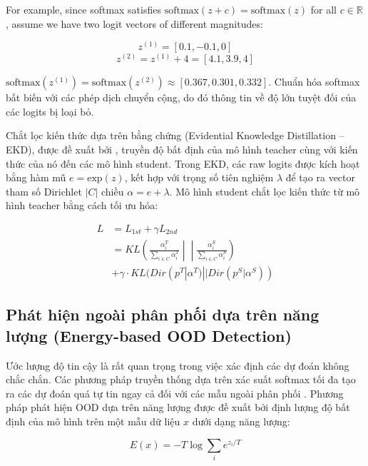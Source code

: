 For example, since softmax satisfies $\text{softmax}(z+c) = \text{softmax}(z)$ for all $c \in \mathbb{R}$, assume we have two logit vectors of different magnitudes:

$$z^{(1)} = [0.1, -0.1, 0]$$
$$z^{(2)} = z^{(1)}+4 = [4.1, 3.9, 4]$$

$\text{softmax}(z^{(1)}) = \text{softmax}(z^{(2)}) \approx [0.367, 0.301, 0.332]$. Chuẩn hóa softmax bất biến với các phép dịch chuyển cộng, do đó thông tin về độ lớn tuyệt đối của các logits bị loại bỏ.

Chắt lọc kiến thức dựa trên bằng chứng (Evidential Knowledge Distillation -- EKD), được đề xuất bởi \cite{xiang2025ekd}, truyền độ bất định của mô hình teacher cùng với kiến thức của nó đến các mô hình student. Trong EKD, các raw logits được kích hoạt bằng hàm mũ $e=\text{exp}(z)$, kết hợp với trọng số tiên nghiệm $\lambda$ để tạo ra vector tham số Dirichlet $|C|$ chiều $\alpha = e + \lambda$. Mô hình student chắt lọc kiến thức từ mô hình teacher bằng cách tối ưu hóa:

\begin{equation}
\label{ekd}
\begin{split}
L & = L_{1st} + \gamma L_{2nd} \\
  & = KL\left(\frac{\alpha_i^T}{\sum_{i \in C}\alpha_i^T} \middle|\middle| \frac{\alpha_i^S}{\sum_{i \in C}\alpha_i^S}\right) \\
  & +\gamma \cdot KL(Dir(p^T|\alpha^T)||Dir(p^S|\alpha^S))
\end{split}
\end{equation}

\subsection{Phát hiện ngoài phân phối dựa trên năng lượng (Energy-based OOD Detection)}
\label{sec:energy}

Ước lượng độ tin cậy là rất quan trọng trong việc xác định các dự đoán không chắc chắn. Các phương pháp truyền thống dựa trên xác suất softmax tối đa tạo ra các dự đoán quá tự tin ngay cả đối với các mẫu ngoài phân phối \cite{liu2020energy}. Phương pháp phát hiện OOD dựa trên năng lượng được đề xuất bởi \cite{liu2020energy} định lượng độ bất định của mô hình trên một mẫu dữ liệu $x$ dưới dạng năng lượng:

\begin{equation}
\label{energy}
E(x) = -T \log\sum_i e^{{z_i}/T}
\end{equation}

